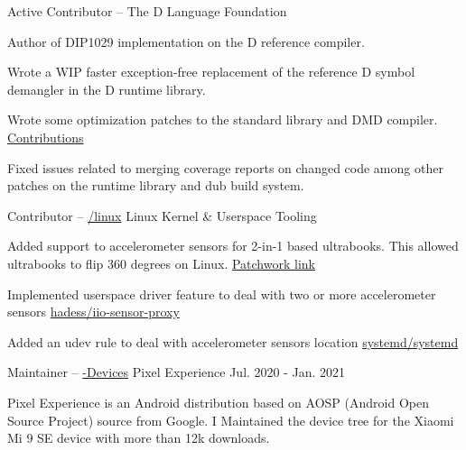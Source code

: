 \begin{cventries}
  \cventry
    {Active Contributor --
    \href{https://github.com/dlang}{\faGithubSquare\acvHeaderIconSep\@dlang}} %
    {The D Language Foundation} %
    {} %
    {} %
    {
      \begin{cvitems} %
        \item {Author of DIP1029 implementation on the D reference compiler.}
        \item {Wrote a WIP faster exception-free replacement of the reference D symbol demangler in the D runtime library.}
        \item {Wrote some optimization patches to the standard library and DMD compiler.\hfill
        \href{https://github.com/pulls?q=is\%3Apr+author\%3Aljmf00+is\%3Aclosed+org\%3Adlang+}{Contributions \acvHeaderIconSep\@\faGithubSquare}}
        \item {Fixed issues related to merging coverage reports on changed code among other patches on the runtime library and dub build system.}
      \end{cvitems}
    }

  \cventry
    {Contributor -- \href{https://github.com/torvalds/linux/}{\faGithubSquare\acvHeaderIconSep\@torvalds/linux}} %
    {Linux Kernel \scriptsize \& Userspace Tooling} %
    {} %
    {} %
    {
      \begin{cvitems} %
        \item {Added support to accelerometer sensors for 2-in-1 based ultrabooks. This allowed ultrabooks to flip 360 degrees on Linux. \hfill \href{https://patchwork.kernel.org/patch/10882031/}{Patchwork link}}
        \item {Implemented userspace driver feature to deal with two or more accelerometer sensors \hfill \href{https://github.com/hadess/iio-sensor-proxy/pull/262}{hadess/iio-sensor-proxy\acvHeaderIconSep\@\faGithubSquare}}
        \item{Added an udev rule to deal with accelerometer sensors location \hfill \href{https://github.com/systemd/systemd/pull/12322/}{systemd/systemd\acvHeaderIconSep\@\faGithubSquare}}
      \end{cvitems}
    }

  \cventry
    {Maintainer --
    \href{https://github.com/PixelExperience-Devices}{\faGithubSquare\acvHeaderIconSep\@PixelExperience-Devices}} %
    {Pixel Experience} %
    {} %
    {Jul. 2020 - Jan. 2021} %
    {
      \begin{cvitems} %
        \item {Pixel Experience is an Android distribution based on AOSP (Android Open Source Project) source from Google. I Maintained the device tree for the Xiaomi Mi 9 SE device with more than 12k downloads.}
      \end{cvitems}
    }


\end{cventries}
